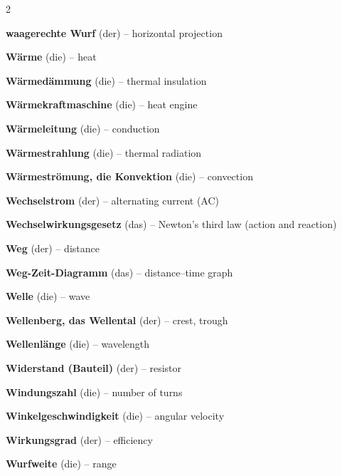 \begin{multicols}{2}
\par\nopagebreak
\textbf{waagerechte Wurf} (der) -- horizontal projection\dotfill\hyperref[e:48]{\pageref*{e:48}}\par
\textbf{Wärme} (die) -- heat\dotfill\hyperref[e:117]{\pageref*{e:117}}\par
\textbf{Wärmedämmung} (die) -- thermal insulation\dotfill\hyperref[e:123]{\pageref*{e:123}}\par
\textbf{Wärmekraftmaschine} (die) -- heat engine\dotfill\hyperref[e:141]{\pageref*{e:141}}\par
\textbf{Wärmeleitung} (die) -- conduction\dotfill\hyperref[e:120]{\pageref*{e:120}}\par
\textbf{Wärmestrahlung} (die) -- thermal radiation\dotfill\hyperref[e:122]{\pageref*{e:122}}\par
\textbf{Wärmeströmung, die Konvektion} (die) -- convection\dotfill\hyperref[e:121]{\pageref*{e:121}}\par
\textbf{Wechselstrom} (der) -- alternating current (AC)\dotfill\hyperref[e:167]{\pageref*{e:167}}\par
\textbf{Wechselwirkungsgesetz} (das) -- Newton's third law (action and reaction)\dotfill\hyperref[e:78]{\pageref*{e:78}}\par
\textbf{Weg} (der) -- distance\dotfill\hyperref[e:35]{\pageref*{e:35}}\par
\textbf{Weg-Zeit-Diagramm} (das) -- distance–time graph\dotfill\hyperref[e:44]{\pageref*{e:44}}\par
\textbf{Welle} (die) -- wave\dotfill\hyperref[e:201]{\pageref*{e:201}}\par
\textbf{Wellenberg, das Wellental} (der) -- crest, trough\dotfill\hyperref[e:204]{\pageref*{e:204}}\par
\textbf{Wellenlänge} (die) -- wavelength\dotfill\hyperref[e:202]{\pageref*{e:202}}\par
\textbf{Widerstand (Bauteil)} (der) -- resistor\dotfill\hyperref[e:159]{\pageref*{e:159}}\par
\textbf{Windungszahl} (die) -- number of turns\dotfill\hyperref[e:182]{\pageref*{e:182}}\par
\textbf{Winkelgeschwindigkeit} (die) -- angular velocity\dotfill\hyperref[e:54]{\pageref*{e:54}}\par
\textbf{Wirkungsgrad} (der) -- efficiency\dotfill\hyperref[e:106]{\pageref*{e:106}}\par
\textbf{Wurfweite} (die) -- range\dotfill\hyperref[e:49]{\pageref*{e:49}}\par


\end{multicols}
